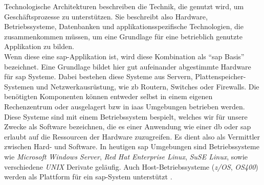 Technologische Architekturen beschreiben die Technik, die genutzt wird, um Geschäftspro\-zesse zu unterstützen. Sie beschreibt also Hardware, Betriebssysteme, Datenbanken und applikationsspezifische Technologien, die zusammenkommen müssen, um eine Grundlage für eine betrieblich genutzte Applikation zu bilden.\\
Wenn diese eine \gls{sap}-Applikation ist, wird diese Kombination als "`\gls{sap} Basis"' bezeichnet.
Eine Grundlage bildet hier gut aufeinander abgestimmte Hardware für \gls{sap} Systeme. Dabei bestehen diese Systeme aus Servern, Plattenspeicher-Systemen und Netzwerkausrüstung, wie \gls{zb} Routern, Switches oder Firewalls. Die benötigten Komponenten können entweder selbst in einem eigenen Rechenzentrum oder ausgelagert \gls{bzw} in \gls{iaas} Umgebungen betrieben werden.\\
Diese Systeme sind mit einem Betriebssystem bespielt, welches wir für unsere Zwecke als Software bezeichnen, die es einer Anwendung wie einer \gls{db} oder \gls{sap} erlaubt auf die Ressourcen der Hardware zuzugreifen. Es dient also als Vermittler zwischen Hard- und Software.
In heutigen \gls{sap} Umgebungen sind Betriebssysteme wie \emph{Microsoft Windows Server}, \emph{Red Hat Enterprise Linux}, \emph{SuSE Linux}, sowie verschiedene \emph{UNIX} Derivate geläufig. Auch Host-Betriebssysteme (\emph{z/OS}, \emph{OS400}) werden als Plattform für ein \gls{sap}-System unterstützt \cite{SAPin24hrs}. 

